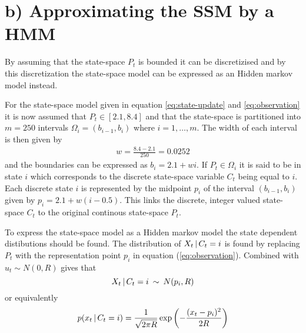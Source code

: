 \section*{b) Approximating the SSM by a HMM}
%
By assuming that the state-space $P_t$ is bounded it can be discretizised and by this discretization the state-space model can be expressed as an Hidden markov model instead. 

For the state-space model given in equation \ref{eq:state-update} and \ref{eq:observation} it is now assumed that $P_t\in[2.1,8.4]$ and that the state-space is partitioned into $m=250$ intervals $\Omega_i=(b_{i-1},b_i)$ where $i=1,\dots,m$. The width of each interval is then given by
\begin{align*}
    w = \frac{8.4 - 2.1}{250} = 0.0252
\end{align*}
and the boundaries can be expressed as $b_i = 2.1 + wi$. If $P_t\in\Omega_i$ it is said to be in state $i$ which corresponds to the discrete state-space variable $C_t$ being equal to $i$. Each discrete state $i$ is represented by the midpoint $p_i$ of the interval $(b_{i-1},b_i)$ given by $p_i = 2.1 + w(i-0.5)$. This links the discrete, integer valued state-space $C_t$ to the original continous state-space $P_t$.

To express the state-space model as a Hidden markov model the state dependent distibutions should be found. The distribution of $X_t\,|\, C_t=i$ is found by replacing $P_t$ with the representation point $p_i$ in equation (\ref{eq:observation}). Combined with $u_t\sim N(0,R)$ gives that 
%
\begin{equation*}
    X_t\,|\, C_t=i\:\sim\: N(p_i, R)
\end{equation*}
%
or equivalently
%
\begin{equation*}
    p(x_t\,|\, C_t=i) = \frac{1}{\sqrt{2\pi R}}\exp\left(-\frac{(x_t - p_i)^2}{2R}\right)
\end{equation*}

